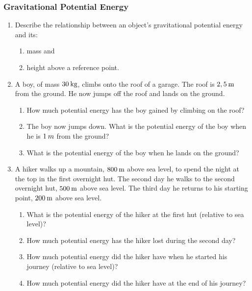             \subsubsection{  Gravitational Potential Energy }
            \nopagebreak
      \label{m38784*id66588}\begin{enumerate}[noitemsep, label=\textbf{\arabic*}. ] 
            \label{m38784*uid50}\item Describe the relationship between an object's gravitational potential energy and its:
\label{m38784*id66604}\begin{enumerate}[noitemsep, label=\textbf{\alph*}. ] 
            \label{m38784*uid51}\item mass and
\label{m38784*uid52}\item height above a reference point.
\end{enumerate}
                \label{m38784*uid53}\item A boy, of mass $30\phantom{\rule{2pt}{0ex}}\mathrm{kg}$, climbs onto the roof of a garage. The roof is $2,5\phantom{\rule{2pt}{0ex}}\mathrm{m}$ from the ground. He now jumps off the roof and lands on the ground.
\label{m38784*id66646}\begin{enumerate}[noitemsep, label=\textbf{\alph*}. ] 
            \label{m38784*uid54}\item How much potential energy has the boy gained by climbing on the roof?
\label{m38784*uid55}\item The boy now jumps down. What is the potential energy of the boy when he is $1\phantom{\rule{2pt}{0ex}}m$ from the ground?
\label{m38784*uid56}\item What is the potential energy of the boy when he lands on the ground?
\end{enumerate}
                \label{m38784*uid57}\item A hiker walks up a mountain, $800\phantom{\rule{2pt}{0ex}}\mathrm{m}$ above sea level, to spend the night at the top in the first overnight hut. The second day he walks to the second overnight hut, $500\phantom{\rule{2pt}{0ex}}\mathrm{m}$ above sea level. The third day he returns to his starting point, $200\phantom{\rule{2pt}{0ex}}\mathrm{m}$ above sea level.
\label{m38784*id66702}\begin{enumerate}[noitemsep, label=\textbf{\alph*}. ] 
            \label{m38784*uid58}\item What is the potential energy of the hiker at the first hut (relative to sea level)?
\label{m38784*uid59}\item How much potential energy has the hiker lost during the second day?
\label{m38784*uid60}\item How much potential energy did the hiker have when he started his journey (relative to sea level)?
\label{m38784*uid61}\item How much potential energy did the hiker have at the end of his journey?
\end{enumerate}
                \end{enumerate}
